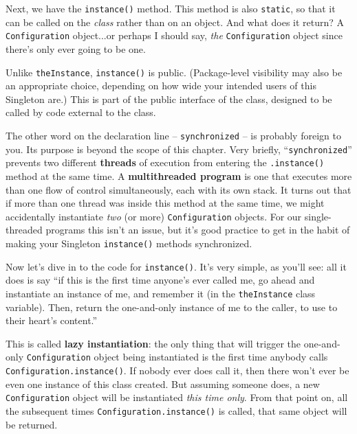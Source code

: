Next, we have the \texttt{instance()} method. This method is also
\texttt{static}, so that it can be called on the \textit{class} rather than on
an object. And what does it return? A \texttt{Configuration} object...or
perhaps I should say, \textit{the} \texttt{Configuration} object since there's
only ever going to be one.


Unlike \texttt{theInstance}, \texttt{instance()} is public. (Package-level
visibility may also be an appropriate choice, depending on how wide your
intended users of this Singleton are.) This is part of the public interface of
the class, designed to be called by code external to the class.


The other word on the declaration line -- \texttt{synchronized} -- is probably
foreign to you. Its purpose is beyond the scope of this chapter. Very briefly,
``\texttt{synchronized}'' prevents two different \textbf{threads} of execution
from entering the \texttt{.instance()} method at the same time. A
\textbf{multithreaded program} is one that executes more than one flow of
control simultaneously, each with its own stack. It turns out that if more than
one thread was inside this method at the same time, we might accidentally
instantiate \textit{two} (or more) \texttt{Configuration} objects. For our
single-threaded programs this isn't an issue, but it's good practice to get in
the habit of making your Singleton \texttt{instance()} methods synchronized.

Now let's dive in to the code for \texttt{instance()}. It's very simple, as
you'll see: all it does is say ``if this is the first time anyone's ever
called me, go ahead and instantiate an instance of me, and remember it (in the
\texttt{theInstance} class variable). Then, return the one-and-only instance
of me to the caller, to use to their heart's content.''

This is called \textbf{lazy instantiation}: the only thing that will trigger
the one-and-only \texttt{Configuration} object being instantiated is the first
time anybody calls \texttt{Configuration.instance()}. If nobody ever does call
it, then there won't ever be even one instance of this class created. But
assuming someone does, a new \texttt{Configuration} object will be instantiated
\textit{this time only}. From that point on, all the subsequent times
\texttt{Configuration.instance()} is called, that same object will be returned.

